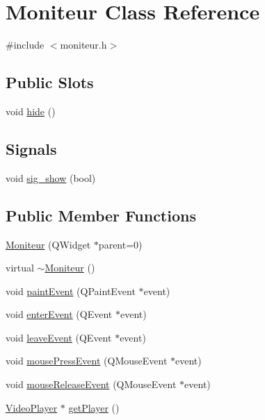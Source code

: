 \hypertarget{class_moniteur}{\section{\-Moniteur \-Class \-Reference}
\label{class_moniteur}
}


{\ttfamily \#include $<$moniteur.\-h$>$}

\subsection*{\-Public \-Slots}
\begin{DoxyCompactItemize}
\item 
void \hyperlink{class_moniteur_a3a5780bf4147513e55f29dce6a3415c7}{hide} ()
\end{DoxyCompactItemize}
\subsection*{\-Signals}
\begin{DoxyCompactItemize}
\item 
void \hyperlink{class_moniteur_a4341889fd03a2da35ba7b3e8b5e88116}{sig\-\_\-show} (bool)
\end{DoxyCompactItemize}
\subsection*{\-Public \-Member \-Functions}
\begin{DoxyCompactItemize}
\item 
\hyperlink{class_moniteur_a102866e2f68e83d1a28f4b116201e8cd}{\-Moniteur} (\-Q\-Widget $\ast$parent=0)
\item 
virtual \hyperlink{class_moniteur_ad3be3ba2155707ed8c5cd5cd660b3090}{$\sim$\-Moniteur} ()
\item 
void \hyperlink{class_moniteur_a148e1a44aaa27fa1a14be777a208d989}{paint\-Event} (\-Q\-Paint\-Event $\ast$event)
\item 
void \hyperlink{class_moniteur_a6883b4cba5d54584280f9e029bb8844e}{enter\-Event} (\-Q\-Event $\ast$event)
\item 
void \hyperlink{class_moniteur_a61d1e4bc765487ecc9a8817b6cafc562}{leave\-Event} (\-Q\-Event $\ast$event)
\item 
void \hyperlink{class_moniteur_a1584bd3068a535c8be9add7fa8ea6755}{mouse\-Press\-Event} (\-Q\-Mouse\-Event $\ast$event)
\item 
void \hyperlink{class_moniteur_a1af1b4a0b4b67f9fdac9c8fe13b49898}{mouse\-Release\-Event} (\-Q\-Mouse\-Event $\ast$event)
\item 
\hyperlink{class_video_player}{\-Video\-Player} $\ast$ \hyperlink{class_moniteur_af4ac90c4a3946ccc7161537b28bbd3d4}{get\-Player} ()
\end{DoxyCompactItemize}
